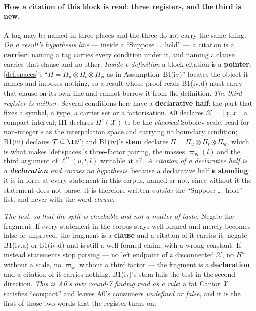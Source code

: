 \paragraph{How a citation of this block is read: three registers, and the third is new.}
A tag may be named in three places and the three do not carry the same thing.
\emph{On a result's hypothesis line} --- inside a ``Suppose \dots\ hold'' --- a citation is a
\textbf{carrier}: naming a tag carries every condition under it, and naming a clause carries that clause
and no other. \emph{Inside a definition} a block citation is a \textbf{pointer}: \cref{def:spaces}'s
``$\Pi=\Pi_u\otimes\Pi_t\otimes\Pi_{\mathsf w}$ as in Assumption~B1(iv)'' locates the object it names and
imposes nothing, so a result whose proof reads B1(iv.d) must carry that clause on its own line and
cannot borrow it from the definition. \emph{The third register is neither.} Several conditions here have
a \textbf{declarative half}: the part that fixes a symbol, a type, a carrier set or a factorisation. A0
declares $\mathcal X=[\underline x,\bar x]$ a compact interval; H1 declares $H^{s}(\mathcal X)$ to be the
\emph{classical} Sobolev scale, read for non-integer $s$ as the interpolation space and carrying no
boundary condition; B1(iii) declares $\mathcal T\subseteq\IR^{p}$; and B1(iv)'s \textbf{stem} declares
$\Pi=\Pi_u\otimes\Pi_t\otimes\Pi_{\mathsf w}$, which is what makes \cref{def:spaces}'s three-factor
pairing, the masses $\varpi_{\mathsf w}(l)$ and the third argument of $\ell^\Pi(u,t,l)$ writable at all.
\emph{A citation of a declarative half is a \textbf{declaration} and carries no hypothesis}, because a
declarative half is \textbf{standing}: it is in force at every statement in this corpus, named or not,
since without it the statement does not parse. It is therefore written \emph{outside} the
``Suppose \dots\ hold'' list, and never with the word \emph{clause}.

\emph{The test, so that the split is checkable and not a matter of taste.} Negate the fragment. If every
statement in the corpus stays well formed and merely becomes false or unproved, the fragment is a
\textbf{clause} and a citation of it carries it: negate B1(iv.a) or B1(iv.d) and
 is still a well-formed claim, with a wrong constant. If instead
statements stop parsing --- no left endpoint of a disconnected $\mathcal X$, no $H^{s}$ without a scale,
no $\varpi_{\mathsf w}$ without a third factor --- the fragment is a \textbf{declaration} and a citation
of it carries nothing. B1(iv)'s stem fails the test in the second direction. \emph{This is A0's own
round-7 finding read as a rule}: a fat Cantor $\mathcal X$ satisfies ``compact'' and leaves A0's
consumers \emph{undefined or false}, and it is the first of those two words that the register turns on.

